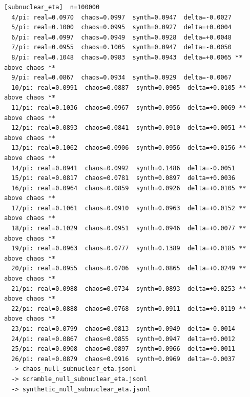 \documentclass[11pt, letterpaper, openany]{book}
\begin{document}
\begin{empiricalbox}
\begin{lstlisting}[style=terminal]
[subnuclear_eta]  n=100000
  4/pi: real=0.0970  chaos=0.0997  synth=0.0947  delta=-0.0027
  5/pi: real=0.1000  chaos=0.0995  synth=0.0927  delta=+0.0004
  6/pi: real=0.0997  chaos=0.0949  synth=0.0928  delta=+0.0048
  7/pi: real=0.0955  chaos=0.1005  synth=0.0947  delta=-0.0050
  8/pi: real=0.1048  chaos=0.0983  synth=0.0943  delta=+0.0065 ** above chaos **
  9/pi: real=0.0867  chaos=0.0934  synth=0.0929  delta=-0.0067
  10/pi: real=0.0991  chaos=0.0887  synth=0.0905  delta=+0.0105 ** above chaos **
  11/pi: real=0.1036  chaos=0.0967  synth=0.0956  delta=+0.0069 ** above chaos **
  12/pi: real=0.0893  chaos=0.0841  synth=0.0910  delta=+0.0051 ** above chaos **
  13/pi: real=0.1062  chaos=0.0906  synth=0.0956  delta=+0.0156 ** above chaos **
  14/pi: real=0.0941  chaos=0.0992  synth=0.1486  delta=-0.0051
  15/pi: real=0.0817  chaos=0.0781  synth=0.0897  delta=+0.0036
  16/pi: real=0.0964  chaos=0.0859  synth=0.0926  delta=+0.0105 ** above chaos **
  17/pi: real=0.1061  chaos=0.0910  synth=0.0963  delta=+0.0152 ** above chaos **
  18/pi: real=0.1029  chaos=0.0951  synth=0.0946  delta=+0.0077 ** above chaos **
  19/pi: real=0.0963  chaos=0.0777  synth=0.1389  delta=+0.0185 ** above chaos **
  20/pi: real=0.0955  chaos=0.0706  synth=0.0865  delta=+0.0249 ** above chaos **
  21/pi: real=0.0988  chaos=0.0734  synth=0.0893  delta=+0.0253 ** above chaos **
  22/pi: real=0.0888  chaos=0.0768  synth=0.0911  delta=+0.0119 ** above chaos **
  23/pi: real=0.0799  chaos=0.0813  synth=0.0949  delta=-0.0014
  24/pi: real=0.0867  chaos=0.0855  synth=0.0947  delta=+0.0012
  25/pi: real=0.0908  chaos=0.0897  synth=0.0966  delta=+0.0011
  26/pi: real=0.0879  chaos=0.0916  synth=0.0969  delta=-0.0037
  -> chaos_null_subnuclear_eta.jsonl
  -> scramble_null_subnuclear_eta.jsonl
  -> synthetic_null_subnuclear_eta.jsonl


\end{lstlisting}
\end{empiricalbox}
\end{document}

